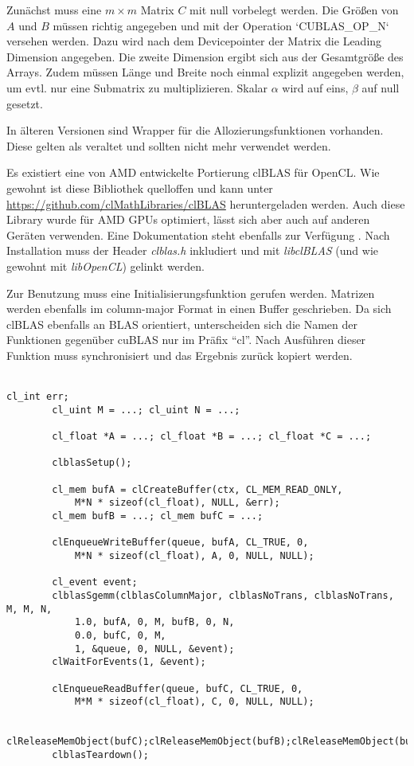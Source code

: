 		Zunächst muss eine $m\times m$ Matrix $C$ mit null vorbelegt werden. Die Größen von $A$ und $B$ müssen richtig angegeben und mit der Operation \li`CUBLAS_OP_N` versehen werden. Dazu wird nach dem Devicepointer der Matrix die Leading Dimension angegeben. Die zweite Dimension ergibt sich aus der Gesamtgröße des Arrays. Zudem müssen Länge und Breite noch einmal explizit angegeben werden, um evtl. nur eine Submatrix zu multiplizieren. Skalar $\alpha$ wird auf eins, $\beta$ auf null gesetzt. 
		
		In älteren Versionen sind Wrapper für die Allozierungsfunktionen vorhanden. Diese gelten als veraltet und sollten nicht mehr verwendet werden.
		
		Es existiert eine von AMD entwickelte Portierung clBLAS für OpenCL. Wie gewohnt ist diese Bibliothek quelloffen und kann unter \url{https://github.com/clMathLibraries/clBLAS} heruntergeladen werden. Auch diese Library wurde für AMD GPUs optimiert, lässt sich aber auch auf anderen Geräten verwenden. Eine Dokumentation steht ebenfalls zur Verfügung \autocite{clblasDoc}. Nach Installation muss der Header \textit{clblas.h} inkludiert und mit \textit{libclBLAS} (und wie gewohnt mit \textit{libOpenCL}) gelinkt werden.

		Zur Benutzung muss eine Initialisierungsfunktion gerufen werden. Matrizen werden ebenfalls im column-major Format in einen Buffer geschrieben. Da sich clBLAS ebenfalls an BLAS orientiert, unterscheiden sich die Namen der Funktionen gegenüber cuBLAS nur im Präfix \enquote{cl}. Nach Ausführen dieser Funktion muss synchronisiert und das Ergebnis zurück kopiert werden.\\ \\
		\begin{lstlisting}[caption=clBLAS Beispiel]
		cl_int err;
		cl_uint M = ...; cl_uint N = ...;
		
		cl_float *A = ...; cl_float *B = ...; cl_float *C = ...;
		
		clblasSetup();
		
		cl_mem bufA = clCreateBuffer(ctx, CL_MEM_READ_ONLY,  
			M*N * sizeof(cl_float), NULL, &err); 
		cl_mem bufB = ...; cl_mem bufC = ...;

		clEnqueueWriteBuffer(queue, bufA, CL_TRUE, 0, 
			M*N * sizeof(cl_float), A, 0, NULL, NULL);       
		 
		cl_event event;
		clblasSgemm(clblasColumnMajor, clblasNoTrans, clblasNoTrans, M, M, N,
			1.0, bufA, 0, M, bufB, 0, N, 
			0.0, bufC, 0, M,
			1, &queue, 0, NULL, &event);
		clWaitForEvents(1, &event);

		clEnqueueReadBuffer(queue, bufC, CL_TRUE, 0, 
			M*M * sizeof(cl_float), C, 0, NULL, NULL);

		clReleaseMemObject(bufC);clReleaseMemObject(bufB);clReleaseMemObject(bufA);
		clblasTeardown();
		\end{lstlisting}
		
